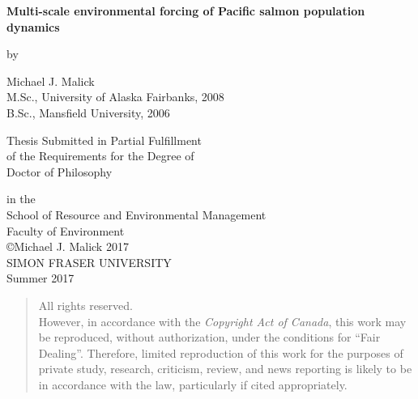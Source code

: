 


\vspace*{-11mm}
\begin{center}

\begin{spacing}{2.0}
  { \large \textbf{Multi-scale environmental forcing of Pacific salmon
                   population dynamics}}

\end{spacing}

\vspace{8mm}
by
\vspace{8mm}

\begin{doublespace}
Michael J. Malick  \\
M.Sc., University of Alaska Fairbanks, 2008 \\
B.Sc., Mansfield University, 2006 \\
\end{doublespace}

\vspace{10mm}
Thesis Submitted in Partial Fulfillment \\
of the Requirements for the Degree of \\

\vspace{5mm}
Doctor of Philosophy \\
\vspace{5mm}

in the \\
School of Resource and Environmental Management \\
Faculty of Environment \\

\vspace{10mm}
\copyright Michael J. Malick 2017 \\
SIMON FRASER UNIVERSITY \\
Summer 2017 \\

\vspace{15mm}
\begin{quote}
  \begin{center}
All rights reserved. \\
However, in accordance with the \emph{Copyright Act of Canada},
this work may be reproduced, without authorization, under the conditions for
``Fair Dealing''. Therefore, limited reproduction of this work for the purposes
of private study, research, criticism, review, and news reporting is likely to
be in accordance with the law, particularly if cited appropriately.
  \end{center}
\end{quote}


\end{center}

